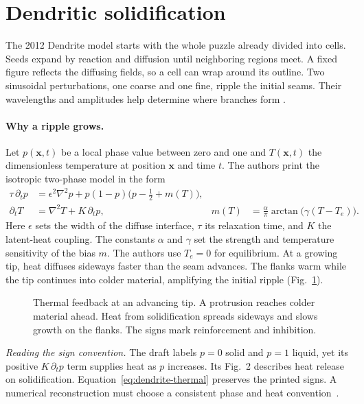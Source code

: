 \section{Dendritic solidification}
\label{sec:dendrite}

The 2012 Dendrite model starts with the whole puzzle already divided into
cells. Seeds expand by reaction and diffusion until neighboring regions meet.
A fixed figure reflects the diffusing fields, so a cell can wrap around its
outline. Two sinusoidal perturbations, one coarse and one fine, ripple the
initial seams. Their wavelengths and amplitudes help determine where branches
form \cite{puzzle2012}.

\paragraph{Why a ripple grows.}
Let \(p(\mathbf{x},t)\) be a local phase value between zero and one and
\(T(\mathbf{x},t)\) the dimensionless temperature at position \(\mathbf{x}\)
and time \(t\). The authors print the isotropic two-phase model in the form
\cite[Eqs.~5--7]{puzzle2012}
\begin{equation}
\begin{aligned}
  \tau\,\partial_t p
    &= \epsilon^2\nabla^2p+p(1-p)\bigl(p-\tfrac12+m(T)\bigr),\\
  \partial_t T
    &= \nabla^2 T+K\,\partial_t p,
    & m(T)&=\frac{\alpha}{\pi}\arctan\!\bigl(\gamma(T-T_e)\bigr).
\end{aligned}
\label{eq:dendrite-thermal}
\end{equation}
Here \(\epsilon\) sets the width of the diffuse interface, \(\tau\) its
relaxation time, and \(K\) the latent-heat coupling. The constants
\(\alpha\) and \(\gamma\) set the strength and temperature sensitivity of the
bias \(m\). The authors use \(T_e=0\) for equilibrium. At a growing tip,
heat diffuses sideways faster than the seam advances. The flanks warm
while the tip continues into colder material, amplifying the initial ripple
(Fig.~\ref{fig:thermal}).

\begin{figure}[!ht]\centering
{}
\caption{Thermal feedback at an advancing tip. A protrusion reaches colder
material ahead. Heat from solidification spreads sideways and slows growth on
the flanks. The signs mark reinforcement and inhibition.}
\label{fig:thermal}
\end{figure}

\textit{Reading the sign convention.} The draft labels $p=0$ solid and
$p=1$ liquid, yet its positive $K\,\partial_t p$ term supplies heat as $p$
increases. Its Fig.~2 describes heat release on solidification. Equation~\eqref{eq:dendrite-thermal}
preserves the printed signs. A numerical reconstruction must choose a
consistent phase and heat convention~\cite[\S3.1]{puzzle2012}.


